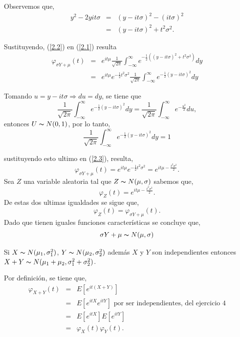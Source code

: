 \documentclass[
  letterpaper,
  DIV=11,
  numbers=noendperiod]{scrreprt}
\begin{document}
Observemos que, \begin{eqnarray}\label{2.2}
y^{2}-2yit\sigma & = & (y-it\sigma)^{2}-(it\sigma)^{2}\nonumber\\
& = & (y-it\sigma)^{2}+t^{2}\sigma^{2}.
\end{eqnarray}

Sustituyendo, (\ref{2.2}) en (\ref{2.1}) resulta
\begin{eqnarray}\label{2.3}
\varphi_{\sigma Y+\mu}(t) & = & e^{it\mu}\frac{1}{\sqrt{2\pi}}\int_{-\infty}^{\infty}e^{-\frac{1}{2}((y-it\sigma)^{2}+t^{2}\sigma^{2}) }dy\nonumber\\
& = & e^{it\mu}e^{-\frac{1}{2}t^{2}\sigma^{2}}\frac{1}{\sqrt{2\pi}}\int_{-\infty}^{\infty}e^{-\frac{1}{2}(y-it\sigma)^{2} }dy
\end{eqnarray}

Tomando \(u=y-it\sigma\Longrightarrow du=dy\), se tiene que \[
\frac{1}{\sqrt{2\pi}}\int_{-\infty}^{\infty}e^{-\frac{1}{2}(y-it\sigma)^{2} }dy=\frac{1}{\sqrt{2\pi}}\int_{-\infty}^{\infty}e^{-\frac{u^{2} }{2}}du,
\] entonces \(U\thicksim N(0,1)\), por lo tanto, \[
\frac{1}{\sqrt{2\pi}}\int_{-\infty}^{\infty}e^{-\frac{1}{2}(y-it\sigma)^{2} }dy=1
\]

sustituyendo esto ultimo en (\ref{2.3}), resulta, \[ 
\varphi_{\sigma Y+\mu}(t)=e^{it\mu}e^{-\frac{1}{2}t^{2}\sigma^{2}}=e^{it\mu-\frac{t^{2}\sigma^{2}}{2}}.
\] Sea \(Z\) una variable aleatoria tal que \(Z\thicksim N(\mu,\sigma)\)
sabemos que, \[ 
\varphi_{Z}(t)=e^{it\mu-\frac{t^{2}\sigma^{2}}{2}}.
\] De estas dos ultimas igualdades se sigue que, \[ 
\varphi_{Z}(t)=\varphi_{\sigma Y+\mu}(t).
\] Dado que tienen iguales funciones características se concluye que, \[
\sigma Y+\mu\thicksim N(\mu,\sigma)
\]

\begin{teor}
Si $X\thicksim N(\mu_{1},\sigma_{1}^{2})$, $Y\thicksim N(\mu_{2},\sigma_{2}^{2})$ además 
$X$ y $Y$ son independientes entonces $X+Y\thicksim N(\mu_{1}+\mu_{2},\sigma_{1}^{2}+\sigma_{2}^{2})$.
\end{teor}

Por definición, se tiene que, \begin{eqnarray}\label{3.1}
\varphi_{X+Y}(t) & = & E[e^{it(X+Y)}]\nonumber\\
& = & E[e^{itX}e^{itY}]\text{ por ser independientes, del ejercicio 4}\nonumber\\
& = & E[e^{itX}]E[e^{itY}]\nonumber\\
& = &  \varphi_{X}(t) \varphi_{Y}(t).
\end{eqnarray}
\end{document}
